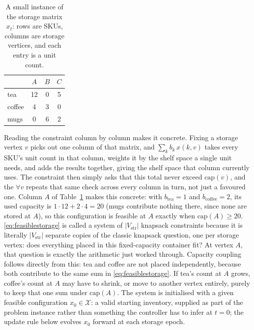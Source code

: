 \documentclass[../main.tex]{subfiles}
\begin{document}
\begin{table}[h]
  \centering
  \caption{A small instance of the storage matrix $x_t$: rows are SKUs,
  columns are storage vertices, and each entry is a unit count.}
  \label{tab:storagematrix}
  \begin{tabular}{lccc}
    \toprule
     & $A$ & $B$ & $C$ \\
    \midrule
    tea    & 12 & 0  & 5 \\
    coffee & 4  & 3  & 0 \\
    mugs   & 0  & 6  & 2 \\
    \bottomrule
  \end{tabular}
\end{table}

Reading the constraint column by column makes it concrete. Fixing a
storage vertex $v$ picks out one column of that matrix, and
$\sum_k b_k\, x(k,v)$ takes every SKU's unit count in that column, weights
it by the shelf space a single unit needs, and adds the results together,
giving the shelf space that column currently uses. The constraint then
simply asks that this total never exceed $\mathrm{cap}(v)$, and the
$\forall v$ repeats that same check across every column in turn, not just
a favoured one. Column $A$ of Table~\ref{tab:storagematrix} makes this
concrete: with $b_{\mathrm{tea}} = 1$ and $b_{\mathrm{coffee}} = 2$, its used
capacity is $1 \cdot 12 + 2 \cdot 4 = 20$ (mugs contribute nothing there,
since none are stored at $A$), so this configuration is feasible at $A$
exactly when $\mathrm{cap}(A) \ge 20$.
\eqref{eq:feasiblestorage} is called a system of $|V_{\mathrm{str}}|$
knapsack constraints \citep{kellerer2004knapsack} because it is literally
$|V_{\mathrm{str}}|$ separate copies of the classic knapsack question, one
per storage vertex: does everything placed in this fixed-capacity container
fit? At vertex $A$, that question is exactly the arithmetic just worked
through. Capacity coupling follows directly from this: tea and coffee are
not placed independently, because both contribute to the same sum in
\eqref{eq:feasiblestorage}. If tea's count at $A$ grows, coffee's count at
$A$ may have to shrink, or move to another vertex entirely, purely to keep
that one sum under $\mathrm{cap}(A)$. The system is initialised with a given
feasible configuration %
$x_0 \in \mathcal{X}$: a valid starting inventory, supplied as part of the
problem instance rather than something the controller has to infer at
$t=0$; the update rule below evolves $x_0$ forward at each storage epoch.
\end{document}
